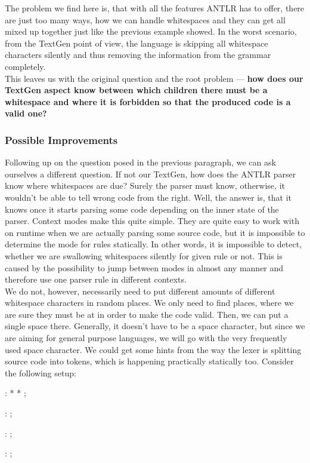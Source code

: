 The problem we find here is, that with all the features ANTLR has to offer, there are just too many ways, how we can handle whitespaces and they can get all mixed up together just like the previous example showed.
In the worst scenario, from the TextGen point of view, the language is skipping all whitespace characters silently and thus removing the information from the grammar completely.
\\

This leaves us with the original question and the root problem --- \textbf{how does our TextGen aspect know between which children there must be a whitespace and where it is forbidden so that the produced code is a valid one?}

\subsubsection{Possible Improvements}

Following up on the question posed in the previous paragraph, we can ask ourselves a different question.
If not our TextGen, how does the ANTLR parser know where whitespaces are due?
Surely the parser must know, otherwise, it wouldn't be able to tell wrong code from the right.
Well, the answer is, that it knows once it starts parsing some code depending on the inner state of the parser.
Context modes make this quite simple.
They are quite easy to work with on runtime when we are actually parsing some source code, but it is impossible to determine the mode for rules statically.
In other words, it is impossible to detect, whether we are swallowing whitespaces silently for given rule or not.
This is caused by the possibility to jump between modes in almost any manner and therefore use one parser rule in different contexts.
\\

We do not, however, necessarily need to put different amounts of different whitespace characters in random places.
We only need to find places, where we are sure they must be at in order to make the code valid.
Then, we can put a single space there.
Generally, it doesn't have to be a space character, but since we are aiming for general purpose languages, we will go with the very frequently used space character.
We could get some hints from the way the lexer is splitting source code into tokens, which is happening practically statically too.
Consider the following setup:

\begin{antlr}
	    :   \literal{<}  * \literal{>} * \literal{</}  \literal{>} ;

	  :       ;

	       :    ;

	       :   \regex{~[<"]*} ;
\end{antlr}

